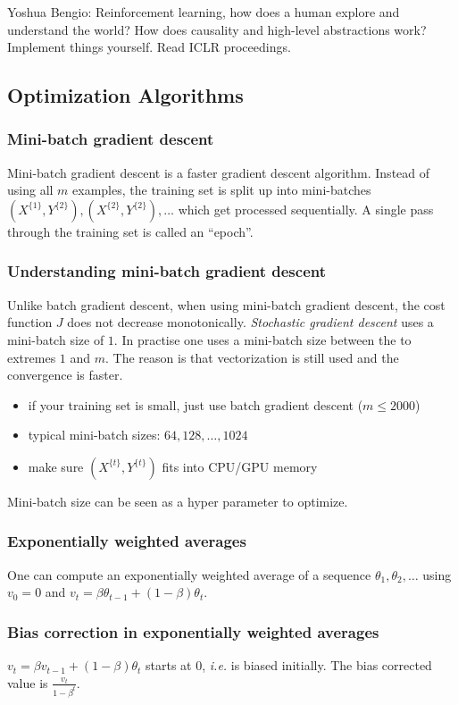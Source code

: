 \documentclass{article}
\begin{document}
Yoshua Bengio: Reinforcement learning, how does a human explore and understand the world?
How does causality and high-level abstractions work?
Implement things yourself. Read ICLR proceedings.

\subsection{Optimization Algorithms}
\subsubsection{Mini-batch gradient descent}
Mini-batch gradient descent is a faster gradient descent algorithm.
Instead of using all $m$ examples, the training set is split up into mini-batches
$(X^{\{1\}},Y^{\{2\}}), (X^{\{2\}},Y^{\{2\}}), \ldots$ which get processed sequentially.
A single pass through the training set is called an ``epoch''.

\subsubsection{Understanding mini-batch gradient descent}
Unlike batch gradient descent, when using mini-batch gradient descent, the cost function $J$ does not decrease monotonically.
\emph{Stochastic gradient descent} uses a mini-batch size of $1$.
In practise one uses a mini-batch size between the to extremes $1$ and $m$.
The reason is that vectorization is still used and the convergence is faster.
\begin{itemize}
  \item if your training set is small, just use batch gradient descent ($m\le 2000$)
  \item typical mini-batch sizes: $64,128,\ldots,1024$
  \item make sure $(X^{\{t\}},Y^{\{t\}})$ fits into CPU/GPU memory
\end{itemize}
Mini-batch size can be seen as a hyper parameter to optimize.

\subsubsection{Exponentially weighted averages}
One can compute an exponentially weighted average of a sequence $\theta_1,\theta_2,\ldots$
using $v_0=0$ and $v_t=\beta\theta_{t-1}+(1-\beta)\theta_t$.

\subsubsection{Bias correction in exponentially weighted averages}
$v_t=\beta v_{t-1}+(1-\beta)\theta_t$ starts at $0$, \emph{i.e.} is biased initially.
The bias corrected value is $\frac{v_t}{1-\beta^t}$.
\end{document}
